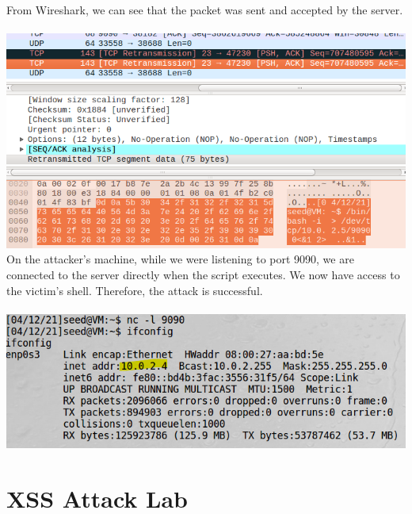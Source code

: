 \documentclass[a4paper]{article}
\begin{document}
From Wireshark, we can see that the packet was sent and accepted by the server.\\\\
\pagebreak
\includegraphics[scale=0.7]{1/36.png}\\
On the attacker's machine, while we were listening to port 9090, we are connected to the server directly when the script executes. We now have access to the victim's shell. Therefore, the attack is successful.\\\\
\includegraphics[scale=0.7]{1/37.png}
\pagebreak
\section{XSS Attack Lab}
\end{document}
